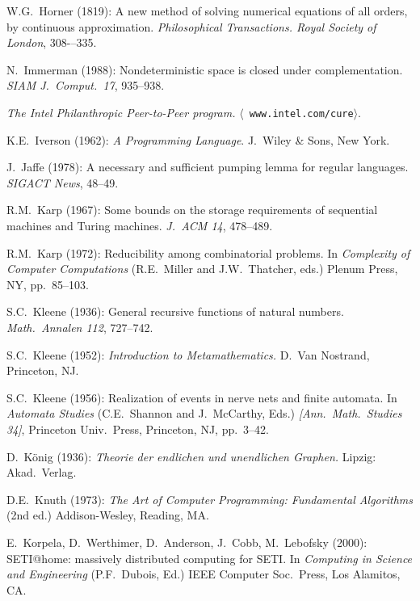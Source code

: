 \begin{thebibliography}{999}
W.G.~Horner (1819): 
A new method of solving numerical equations of all orders, by
continuous approximation. {\it Philosophical Transactions. Royal
Society of London}, 308-–335.


N.~Immerman (1988): Nondeterministic space is closed under
complementation.  {\it SIAM J.~Comput.~17}, 935--938.

{\it The Intel Philanthropic Peer-to-Peer program.}  $\langle${\tt
www.intel.com/cure}$\rangle$.

K.E.~Iverson (1962):
{\it A Programming Language}.
J.~Wiley \& Sons, New York.


J.~Jaffe (1978): A necessary and sufficient pumping lemma for regular
languages.  {\it SIGACT News}, 48--49.


R.M.~Karp (1967): Some bounds on the storage requirements of
sequential machines and Turing machines.  {\it J.~ACM 14}, 478--489.

R.M.~Karp (1972): Reducibility among combinatorial problems.  In {\it
Complexity of Computer Computations} (R.E.~Miller and J.W.~Thatcher,
eds.)  Plenum Press, NY, pp.~85--103.

S.C.~Kleene (1936): General recursive functions of natural numbers.
{\it Math.~Annalen 112}, 727--742.

S.C.~Kleene (1952):
{\it Introduction to Metamathematics.}
D.~Van Nostrand, Princeton, NJ.

S.C.~Kleene (1956): Realization of events in nerve nets and finite
automata.  In {\it Automata Studies} (C.E.~Shannon and J.~McCarthy,
Eds.) {\it [Ann.~Math.~Studies 34]}, Princeton Univ.~Press, Princeton,
NJ, pp.~3--42.

D.~K\"onig (1936):
{\it Theorie der endlichen und unendlichen Graphen.}  Lipzig: Akad.~Verlag.

D.E.~Knuth (1973): {\it The Art of Computer Programming: Fundamental
Algorithms} (2nd ed.)  Addison-Wesley, Reading, MA.

E.~Korpela, D.~Werthimer, D.~Anderson, J.~Cobb, M.~Lebofsky (2000):
SETI@home: massively distributed computing for SETI.  In {\it
Computing in Science and Engineering} (P.F.~Dubois, Ed.)  IEEE
Computer Soc.~Press, Los Alamitos, CA.


\end{thebibliography}
